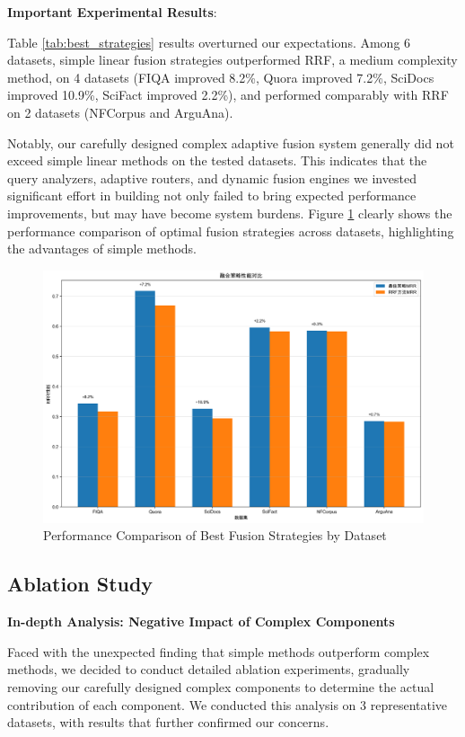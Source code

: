 \documentclass[letterpaper]{article} %
\begin{document}
\textbf{Important Experimental Results}:

Table \ref{tab:best_strategies} results overturned our expectations. Among 6 datasets, simple linear fusion strategies outperformed RRF, a medium complexity method, on 4 datasets (FIQA improved 8.2\%, Quora improved 7.2\%, SciDocs improved 10.9\%, SciFact improved 2.2\%), and performed comparably with RRF on 2 datasets (NFCorpus and ArguAna).

Notably, our carefully designed complex adaptive fusion system generally did not exceed simple linear methods on the tested datasets. This indicates that the query analyzers, adaptive routers, and dynamic fusion engines we invested significant effort in building not only failed to bring expected performance improvements, but may have become system burdens. Figure \ref{fig:fusion_strategies} clearly shows the performance comparison of optimal fusion strategies across datasets, highlighting the advantages of simple methods.

\begin{figure}[t]
\centering
\includegraphics[width=0.8\columnwidth]{charts/fusion_strategy_comparison.png}
\caption{Performance Comparison of Best Fusion Strategies by Dataset}
\label{fig:fusion_strategies}
\end{figure}

\subsection{Ablation Study}

\textbf{In-depth Analysis: Negative Impact of Complex Components}

Faced with the unexpected finding that simple methods outperform complex methods, we decided to conduct detailed ablation experiments, gradually removing our carefully designed complex components to determine the actual contribution of each component. We conducted this analysis on 3 representative datasets, with results that further confirmed our concerns.
\end{document}
